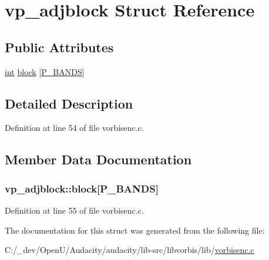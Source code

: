 \hypertarget{structvp__adjblock}{}\section{vp\+\_\+adjblock Struct Reference}
\label{structvp__adjblock}
\subsection*{Public Attributes}
\begin{DoxyCompactItemize}
\item 
\hyperlink{xmltok_8h_a5a0d4a5641ce434f1d23533f2b2e6653}{int} \hyperlink{structvp__adjblock_a2db822d13fa72c7f7808a99a34963d41}{block} \mbox{[}\hyperlink{psy_8h_ae6af2ec0a0f6e0813ae814e9a07c728a}{P\+\_\+\+B\+A\+N\+DS}\mbox{]}
\end{DoxyCompactItemize}


\subsection{Detailed Description}


Definition at line 54 of file vorbisenc.\+c.



\subsection{Member Data Documentation}
\subsubsection[{\texorpdfstring{block}{block}}]{ vp\+\_\+adjblock\+::block\mbox{[}{\bf P\+\_\+\+B\+A\+N\+DS}\mbox{]}}\hypertarget{structvp__adjblock_a2db822d13fa72c7f7808a99a34963d41}{}\label{structvp__adjblock_a2db822d13fa72c7f7808a99a34963d41}


Definition at line 55 of file vorbisenc.\+c.



The documentation for this struct was generated from the following file\+:\begin{DoxyCompactItemize}
\item 
C\+:/\+\_\+dev/\+Open\+U/\+Audacity/audacity/lib-\/src/libvorbis/lib/\hyperlink{vorbisenc_8c}{vorbisenc.\+c}\end{DoxyCompactItemize}
